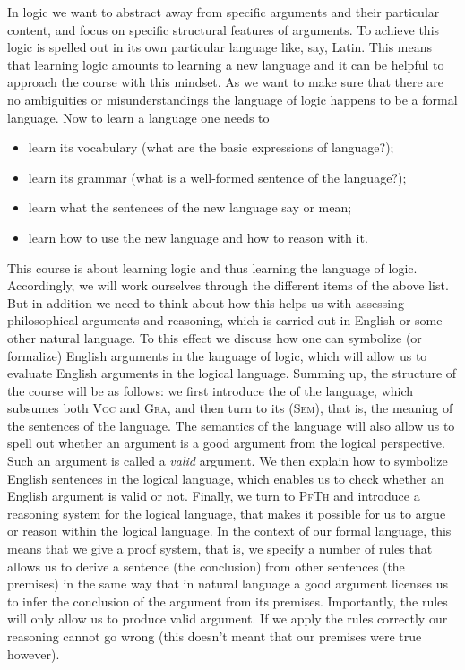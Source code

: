In logic we want to abstract away from specific arguments and their particular content, and focus on specific structural features of arguments. To achieve this  logic is spelled out in its own particular language like, say, Latin.  This means that learning logic amounts to learning a new language and it can be helpful to approach the course with this mindset. As we want to make sure that there are no ambiguities or misunderstandings the language of logic happens to be a formal language. Now to learn a language one needs to
\begin{itemize}
\item[\textsc{Voc}:]\label{vocInt} learn its vocabulary (what are the basic expressions of language?);
\item[\textsc{Gra}:]\label{graInt} learn its grammar (what is a well-formed sentence of the language?);
\item[\textsc{Sem}:]\label{semInt} learn what the sentences of the new language say or mean;
\item[\textsc{PfTh}:]\label{ptInt} learn how to use the new language and how to reason with it.
\end{itemize}

This course is about learning logic and thus learning the language of logic. Accordingly, we will work ourselves through the different items of the above list. But in addition we need to think about how this helps us with assessing philosophical arguments and reasoning, which is carried out in English or some other natural language. To this effect we discuss how one can symbolize (or formalize) English arguments in the language of logic, which will allow us to evaluate English arguments in the logical language. Summing up, the structure of the course will be as follows: we first introduce the  of the language, which subsumes both \textsc{Voc} and \textsc{Gra}, and then turn to its  (\textsc{Sem}), that is, the meaning of the sentences of the language. The semantics of the language will also allow us to spell out whether an argument is a good argument from the logical perspective. Such an argument is called a \emph{valid} argument.  
We then explain how to symbolize English sentences in the logical language, which enables us to check whether an English argument is valid or not. Finally, we turn to \textsc{PfTh} and introduce a reasoning system for the logical language, that makes it possible for us to argue or reason within the logical language. In the context of our formal language, this means that we give a proof system, that is, we specify a number of rules that allows us to derive a sentence (the conclusion) from other sentences (the premises) in the same way that in natural language a good argument licenses us to infer the conclusion of the argument from its premises. Importantly, the rules will only allow us to produce valid argument. If we apply the rules correctly our reasoning cannot go wrong (this doesn't meant that our premises were true however).

